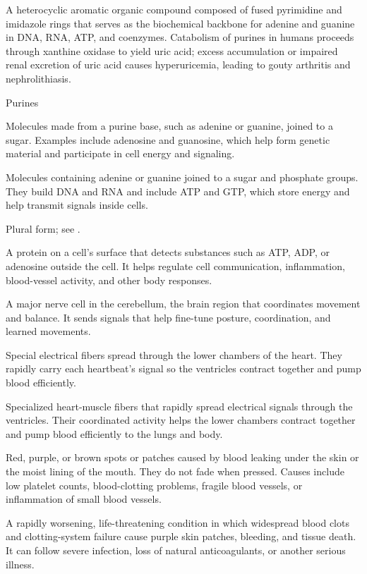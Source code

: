  A heterocyclic aromatic organic compound composed of fused pyrimidine and imidazole rings that serves as the biochemical backbone for adenine and guanine in DNA, RNA, ATP, and coenzymes. Catabolism of purines in humans proceeds through xanthine oxidase to yield uric acid; excess accumulation or impaired renal excretion of uric acid causes hyperuricemia, leading to gouty arthritis and nephrolithiasis.

\synonyms
Purines

 Molecules made from a purine base, such as adenine or guanine, joined to a sugar. Examples include adenosine and guanosine, which help form genetic material and participate in cell energy and signaling.

 Molecules containing adenine or guanine joined to a sugar and phosphate groups. They build DNA and RNA and include ATP and GTP, which store energy and help transmit signals inside cells.

 Plural form; see .

 A protein on a cell’s surface that detects substances such as ATP, ADP, or adenosine outside the cell. It helps regulate cell communication, inflammation, blood-vessel activity, and other body responses.

 A major nerve cell in the cerebellum, the brain region that coordinates movement and balance. It sends signals that help fine-tune posture, coordination, and learned movements.

 Special electrical fibers spread through the lower chambers of the heart. They rapidly carry each heartbeat’s signal so the ventricles contract together and pump blood efficiently.

 Specialized heart-muscle fibers that rapidly spread electrical signals through the ventricles. Their coordinated activity helps the lower chambers contract together and pump blood efficiently to the lungs and body.

 Red, purple, or brown spots or patches caused by blood leaking under the skin or the moist lining of the mouth. They do not fade when pressed. Causes include low platelet counts, blood-clotting problems, fragile blood vessels, or inflammation of small blood vessels.

 A rapidly worsening, life-threatening condition in which widespread blood clots and clotting-system failure cause purple skin patches, bleeding, and tissue death. It can follow severe infection, loss of natural anticoagulants, or another serious illness.

